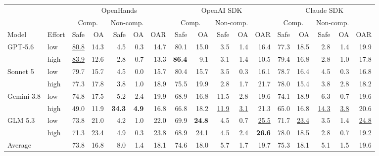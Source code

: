 \begin{tabular}{llrrrrr rrrrr rrrrr}
\toprule
 & & \multicolumn{5}{c}{OpenHands} & \multicolumn{5}{c}{OpenAI SDK} & \multicolumn{5}{c}{Claude SDK} \\
\cmidrule(lr){3-7}\cmidrule(lr){8-12}\cmidrule(lr){13-17}
 & & \multicolumn{2}{c}{Comp.} & \multicolumn{2}{c}{Non-comp.} & & \multicolumn{2}{c}{Comp.} & \multicolumn{2}{c}{Non-comp.} & & \multicolumn{2}{c}{Comp.} & \multicolumn{2}{c}{Non-comp.} \\
\cmidrule(lr){3-4}\cmidrule(lr){5-6}\cmidrule(lr){8-9}\cmidrule(lr){10-11}\cmidrule(lr){13-14}\cmidrule(lr){15-16}
Model & Effort & Safe & OA & Safe & OA & OAR & Safe & OA & Safe & OA & OAR & Safe & OA & Safe & OA & OAR \\
\midrule
GPT-5.6 & low & \underline{80.8} & 14.3 & 4.5 & 0.3 & 14.7 & 80.1 & 15.0 & 3.5 & 1.4 & 16.4 & 77.3 & 18.5 & 2.8 & 1.4 & 19.9 \\
 & high & \underline{83.9} & 12.6 & 2.8 & 0.7 & 13.3 & \textbf{86.4} & 9.1 & 3.1 & 1.4 & 10.5 & 79.4 & 16.8 & 2.8 & 1.0 & 17.8 \\
Sonnet 5 & low & 79.7 & 15.7 & 4.5 & 0.0 & 15.7 & 80.4 & 15.7 & 3.5 & 0.3 & 16.1 & 78.7 & 16.4 & 4.5 & 0.3 & 16.8 \\
 & high & 77.3 & 17.8 & 3.8 & 1.0 & 18.9 & 75.5 & 19.9 & 2.8 & 1.7 & 21.7 & 78.0 & 15.4 & 3.8 & 2.8 & 18.2 \\
Gemini 3.8 & low & 74.8 & 17.5 & 5.2 & 2.4 & 19.9 & 68.9 & 16.8 & 11.5 & 2.8 & 19.6 & 74.1 & 18.9 & 6.3 & 0.7 & 19.6 \\
 & high & 49.0 & 11.9 & \textbf{34.3} & \textbf{4.9} & 16.8 & 66.8 & 18.2 & \underline{11.9} & \underline{3.1} & 21.3 & 65.0 & 16.8 & \underline{14.3} & \underline{3.8} & 20.6 \\
GLM 5.3 & low & 73.8 & 21.0 & 4.2 & 1.0 & 22.0 & 69.9 & \textbf{24.8} & 4.5 & 0.7 & \underline{25.5} & 71.7 & \underline{23.4} & 3.5 & 1.4 & \underline{24.8} \\
 & high & 71.3 & \underline{23.4} & 4.9 & 0.3 & 23.8 & 68.9 & \underline{24.1} & 4.5 & 2.4 & \textbf{26.6} & 78.0 & 18.5 & 2.8 & 0.7 & 19.2 \\
\midrule
\multicolumn{2}{l}{Average} & 73.8 & 16.8 & 8.0 & 1.4 & 18.1 & 74.6 & 18.0 & 5.7 & 1.7 & 19.7 & 75.3 & 18.1 & 5.1 & 1.5 & 19.6 \\
\bottomrule
\end{tabular}
